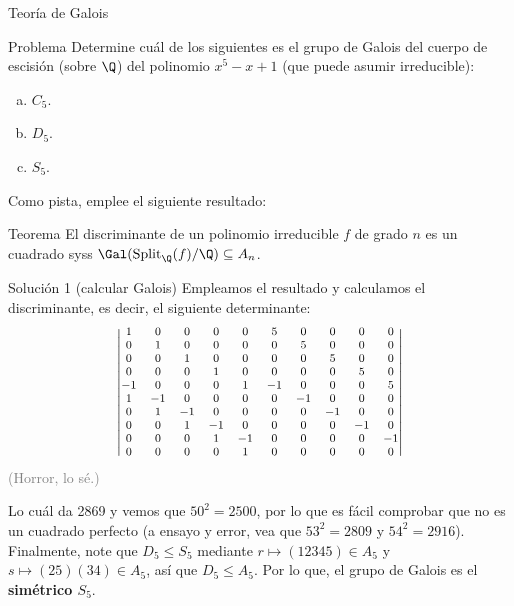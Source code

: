 \documentclass[10pt]{beamer}
\begin{document}
\begin{frame}{Teoría de Galois}
	\begin{block}{Problema}
		Determine cuál de los siguientes es el grupo de Galois del cuerpo de escisión (sobre $\Q$) del polinomio
		$x^5 - x + 1$ (que puede asumir irreducible):
		\begin{enumerate}[(a)]
			\item $C_5$.
			\item $D_5$.
			\item $S_5$.
		\end{enumerate}
	\end{block}
	\pause
	Como pista, emplee el siguiente resultado:
	\begin{block}{Teorema}
		El discriminante de un polinomio irreducible $f$ de grado $n$ es un cuadrado syss
		$\Gal(\operatorname{Split}_\Q(f)/\Q) \subseteq A_n$.
	\end{block}
\end{frame}
\begin{frame}{Solución 1 (calcular Galois)}
	Empleamos el resultado y calculamos el discriminante, es decir, el siguiente determinante:
	\pause
	\[
		\footnotesize
		\begin{vmatrix}
			1 & 0 & 0 & 0 & 0 & 5 & 0 & 0 & 0 & 0 \\
			0 & 1 & 0 & 0 & 0 & 0 & 5 & 0 & 0 & 0 \\
			0 & 0 & 1 & 0 & 0 & 0 & 0 & 5 & 0 & 0 \\
			0 & 0 & 0 & 1 & 0 & 0 & 0 & 0 & 5 & 0 \\
			-1& 0 & 0 & 0 & 1 &-1 & 0 & 0 & 0 & 5 \\
			1 &-1 & 0 & 0 & 0 & 0 &-1 & 0 & 0 & 0 \\
			0 & 1 &-1 & 0 & 0 & 0 & 0 &-1 & 0 & 0 \\
			0 & 0 & 1 &-1 & 0 & 0 & 0 & 0 &-1 & 0 \\
			0 & 0 & 0 & 1 &-1 & 0 & 0 & 0 & 0 &-1 \\
			0 & 0 & 0 & 0 & 1 & 0 & 0 & 0 & 0 & 0
		\end{vmatrix} 
	\]
	\pause
	\textcolor{gray}{(Horror, lo sé.)}

	Lo cuál da 2869 y vemos que $50^2 = 2500$, por lo que es fácil comprobar que no es un cuadrado perfecto
	(a ensayo y error, vea que $53^2 = 2809$ y $54^2 = 2916$).
	\pause
	Finalmente, note que $D_5 \le S_5$ mediante $r \mapsto (12345) \in A_5$ y $s \mapsto (25)(34) \in A_5$, así que
	$D_5 \le A_5$.
	Por lo que, el grupo de Galois es el \textbf{simétrico $S_5$}.
\end{frame}
\end{document}
